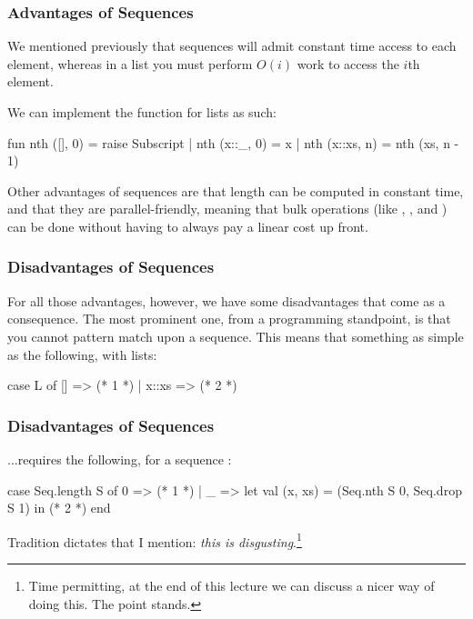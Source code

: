 \documentclass[aspectratio=169]{beamer}
\begin{document}
\begin{frame}[fragile]
  \frametitle{Advantages of Sequences}

  We mentioned previously that sequences will admit constant time access to
  each element, whereas in a list you must perform $O(i)$ work to access the
  $i$th element.

  \pause
  \vspace{\fill}

  We can implement the  function for lists as such:

  \begin{codeblock}
    fun nth ([], 0)   = raise Subscript
      | nth (x::_, 0) = x
      | nth (x::xs, n) = nth (xs, n - 1)
  \end{codeblock}

  \pause
  \vspace{\fill}

  Other advantages of sequences are that length can be computed in constant time,
  and that they are parallel-friendly, meaning that bulk operations (like
  , , and ) can be done
  without having to always pay a linear cost up front.
\end{frame}

\begin{frame}[fragile]
  \frametitle{Disadvantages of Sequences}

  For all those advantages, however, we have some disadvantages that come as a
  consequence. The most prominent one, from a programming standpoint, is that
  you cannot pattern match upon a sequence. This means that something as simple
  as the following, with lists:

  \begin{codeblock}
    case L of
      []    => (* 1 *)
    | x::xs => (* 2 *)
  \end{codeblock}
\end{frame}

\begin{frame}[fragile]
  \frametitle{Disadvantages of Sequences}

  ...requires the following, for a sequence :
  \begin{codeblock}
    case Seq.length S of
      0 => (* 1 *)
    | _ =>
      let
        val (x, xs) = (Seq.nth S 0, Seq.drop S 1)
      in
        (* 2 *)
      end
  \end{codeblock}

  \pause
  \vspace{\fill}

  Tradition dictates that I mention: \textit{this is disgusting}.\footnote{Time
  permitting, at the end of this lecture we can discuss a nicer way of doing
  this. The point stands.}
\end{frame}
\end{document}
